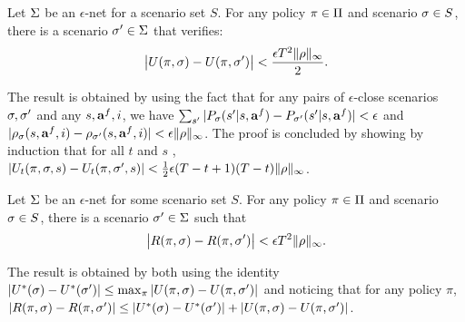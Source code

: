\begin{lemma}
    \label{lemma:scenario_equivalence}
    Let $\Sigma$ be an $\epsilon$-net for a scenario set $S$. For any policy $\pi \in \Pi$ and scenario $\sigma\in S$, there is a scenario $\sigma' \in \Sigma$ that verifies:
    \begin{equation}
        \label{eq:performance.guarantee}
        \big| U(\pi, \sigma) - U(\pi, \sigma') \big| < \dfrac{\epsilon T^2\lVert \rho \rVert_\infty}{2}.
    \end{equation}
\end{lemma}
\begin{proofsketch}
    The result is obtained by using the fact that for any pairs of $\epsilon$-close scenarios $\sigma, \sigma'$ and any $s, \mathbf{a}^f, i$, we have $\sum_{s'}|P_\sigma(s'| s, \mathbf{a}^f) - P_{\sigma'}(s'| s, \mathbf{a}^f) | < \epsilon$ and $|\rho_\sigma(s, \mathbf{a}^f, i) - \rho_{\sigma'}(s, \mathbf{a}^f, i)|\\< \epsilon\lVert \rho \rVert_\infty$. The proof is concluded by showing by induction that for all $t$ and $s$ , $|U_t(\pi, \sigma, s)-U_t(\pi, \sigma', s)| < \frac{1}{2} \epsilon(T-t+1)(T-t)\lVert \rho \rVert_\infty$.
\end{proofsketch}

\begin{lemma}
    \label{lemma:scenario_equivalence_regret}
    Let $\Sigma$ be an $\epsilon$-net for some scenario set $S$. For any policy $\pi\in\Pi$ and scenario $\sigma\in S$, there is a scenario $\sigma' \in \Sigma$ such that
    \begin{equation}
        \label{eq:performance.regret}
        \big| R(\pi, \sigma) - R(\pi, \sigma') \big| < \epsilon T^2\lVert \rho \rVert_\infty.
    \end{equation}
\end{lemma}
\begin{proofsketch}
    The result is obtained by both using the identity $|U^*(\sigma) - U^*(\sigma')| \leq \max_\pi |U(\pi, \sigma) - U(\pi, \sigma')|$
    and noticing that for any policy $\pi$,  $|R(\pi, \sigma)-R(\pi, \sigma')|\leq |U^*(\sigma)- U^*(\sigma')| + |U(\pi, \sigma) - U(\pi, \sigma')|$.
\end{proofsketch}

